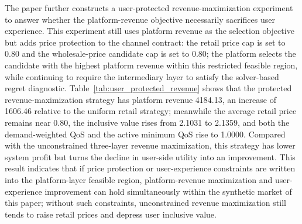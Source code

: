 \documentclass[11pt,a4paper]{article}
\begin{document}
The paper further constructs a user-protected revenue-maximization experiment to answer whether the platform-revenue objective necessarily sacrifices user experience. This experiment still uses platform revenue as the selection objective but adds price protection to the channel contract: the retail price cap is set to 0.80 and the wholesale-price candidate cap is set to 0.80; the platform selects the candidate with the highest platform revenue within this restricted feasible region, while continuing to require the intermediary layer to satisfy the solver-based regret diagnostic. Table~\ref{tab:user_protected_revenue} shows that the protected revenue-maximization strategy has platform revenue 4184.13, an increase of 1606.46 relative to the uniform retail strategy; meanwhile the average retail price remains near 0.80, the inclusive value rises from 2.1031 to 2.1359, and both the demand-weighted QoS and the active minimum QoS rise to 1.0000. Compared with the unconstrained three-layer revenue maximization, this strategy has lower system profit but turns the decline in user-side utility into an improvement. This result indicates that if price protection or user-experience constraints are written into the platform-layer feasible region, platform-revenue maximization and user-experience improvement can hold simultaneously within the synthetic market of this paper; without such constraints, unconstrained revenue maximization still tends to raise retail prices and depress user inclusive value.

\begin{table}[H]
\centering
\caption{Platform-revenue maximization under user-protection constraints}
\label{tab:user_protected_revenue}
\small
{}
\end{table}
\end{document}
